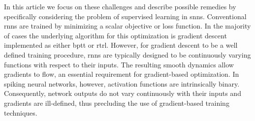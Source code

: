 \documentclass[journal,onecolumn,11pt]{IEEEtran}
\begin{document}
In this article we focus on these challenges and describe possible remedies by specifically considering the problem of supervised learning in \glspl{snn}.
Conventional \glspl{rnn} are trained by minimizing a scalar objective or loss function. 
In the majority of cases the underlying algorithm for this optimization is gradient descent implemented as either \Gls{bptt} or
\gls{rtrl}.
However, for gradient descent to be a well defined training procedure, \glspl{rnn} are typically designed to be continuously varying functions with
respect to their inputs. 
The resulting smooth dynamics allow gradients to flow, %
an essential requirement for gradient-based optimization. 
In spiking neural networks, however, activation functions are intrinsically
binary. 
Consequently, network outputs do not vary continuously with their inputs and gradients are ill-defined, 
thus precluding the use of gradient-based training techniques. 
\end{document}
